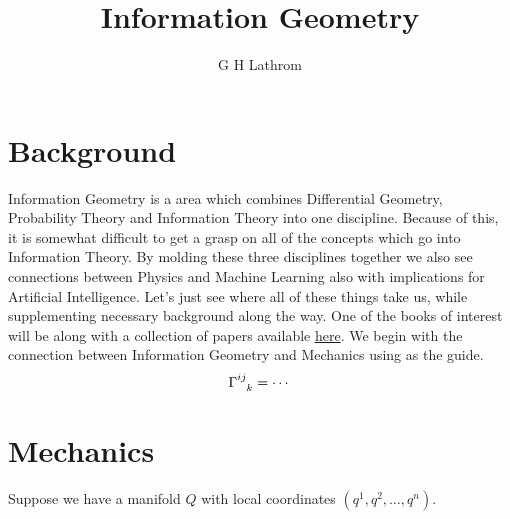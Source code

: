 \documentclass[12pt,letterpaper]{article}
\title{Information Geometry}
\author{G H Lathrom}
\begin{document}
\maketitle



\pagestyle{fancy}
\fancyhf{}
\chead{}
\fancyfoot[C]{\thepage}
\renewcommand{\headrulewidth}{.5pt}

\section{Background}

Information Geometry is a area which combines Differential Geometry, Probability Theory and Information Theory into one discipline.  
Because of this, it is somewhat difficult to get a grasp on all of the concepts which go into Information Theory.  
By molding these three disciplines together we also see connections between Physics and Machine Learning also with implications for Artificial Intelligence.
Let's just see where all of these things take us, while supplementing necessary background along the way.
One of the books of interest will be \cite{dodson} along with a collection of papers available \href{https://mega.nz/folder/5w0CDDzR\#EUMxMbyRJdNSKsqKIuEyFg}{here}.
We begin with the connection between Information Geometry and Mechanics using \cite{leok1} as the guide.
\begin{equation*}
    \tensor{\Gamma}{^{ij}_{k}} = \cdots
\end{equation*}

\section{Mechanics}

Suppose we have a manifold $Q$ with local coordinates $(q^1,q^2,\ldots,q^n)$.



\end{document}
